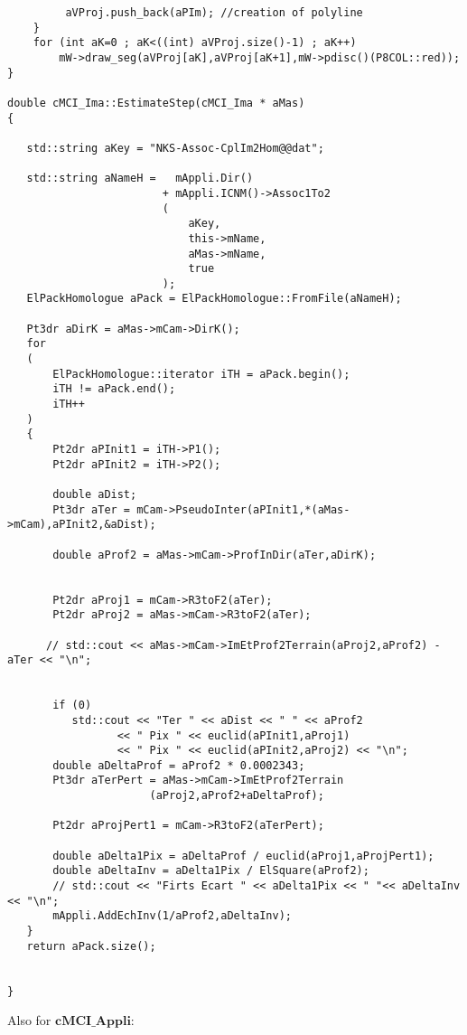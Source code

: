 \documentclass[a4paper]{book}
\begin{document}
\begin{lstlisting}
         aVProj.push_back(aPIm); //creation of polyline
    }
    for (int aK=0 ; aK<((int) aVProj.size()-1) ; aK++)
        mW->draw_seg(aVProj[aK],aVProj[aK+1],mW->pdisc()(P8COL::red));
}

double cMCI_Ima::EstimateStep(cMCI_Ima * aMas)
{

   std::string aKey = "NKS-Assoc-CplIm2Hom@@dat";

   std::string aNameH =   mAppli.Dir()
                        + mAppli.ICNM()->Assoc1To2
                        (
                            aKey,
                            this->mName,
                            aMas->mName,
                            true
                        );
   ElPackHomologue aPack = ElPackHomologue::FromFile(aNameH);

   Pt3dr aDirK = aMas->mCam->DirK();
   for
   (
       ElPackHomologue::iterator iTH = aPack.begin();
       iTH != aPack.end();
       iTH++
   )
   {
       Pt2dr aPInit1 = iTH->P1();
       Pt2dr aPInit2 = iTH->P2();

       double aDist;
       Pt3dr aTer = mCam->PseudoInter(aPInit1,*(aMas->mCam),aPInit2,&aDist);

       double aProf2 = aMas->mCam->ProfInDir(aTer,aDirK);


       Pt2dr aProj1 = mCam->R3toF2(aTer);
       Pt2dr aProj2 = aMas->mCam->R3toF2(aTer);

      // std::cout << aMas->mCam->ImEtProf2Terrain(aProj2,aProf2) -aTer << "\n";


       if (0)
          std::cout << "Ter " << aDist << " " << aProf2
                 << " Pix " << euclid(aPInit1,aProj1)
                 << " Pix " << euclid(aPInit2,aProj2) << "\n";
       double aDeltaProf = aProf2 * 0.0002343;
       Pt3dr aTerPert = aMas->mCam->ImEtProf2Terrain
                      (aProj2,aProf2+aDeltaProf);

       Pt2dr aProjPert1 = mCam->R3toF2(aTerPert);

       double aDelta1Pix = aDeltaProf / euclid(aProj1,aProjPert1);
       double aDeltaInv = aDelta1Pix / ElSquare(aProf2);
       // std::cout << "Firts Ecart " << aDelta1Pix << " "<< aDeltaInv  << "\n";
       mAppli.AddEchInv(1/aProf2,aDeltaInv);
   }
   return aPack.size();


}
\end{lstlisting}
Also for $\textbf{cMCI\_Appli}$:
\end{document}
